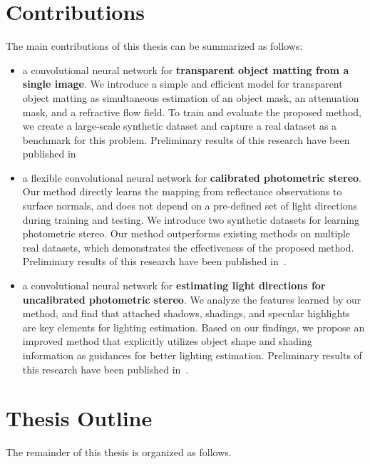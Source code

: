 \section{Contributions}

The main contributions of this thesis can be summarized as follows:

\begin{itemize}
    \item a convolutional neural network for \textbf{transparent object matting from a single image}. We introduce a simple and efficient model for transparent object matting as simultaneous estimation of an object mask, an attenuation mask, and a refractive flow field. To train and evaluate the proposed method, we create a large-scale synthetic dataset and capture a real dataset as a benchmark for this problem. Preliminary results of this research have been published in~\cite{chen2018tomnet,chen2019learning}

    \item a flexible convolutional neural network for \textbf{calibrated photometric stereo}. Our method directly learns the mapping from reflectance observations to surface normals, and does not depend on a pre-defined set of light directions during training and testing. We introduce two synthetic datasets for learning photometric stereo. Our method outperforms existing methods on multiple real datasets, which demonstrates the effectiveness of the proposed method. Preliminary results of this research have been published in~\cite{chen2018ps,chen2020deepps}.
    \item a convolutional neural network for \textbf{estimating light directions for uncalibrated photometric stereo}. We analyze the features learned by our method, and find that attached shadows, shadings, and specular highlights are key elements for lighting estimation. Based on our findings, we propose an improved method that explicitly utilizes object shape and shading information as guidances for better lighting estimation. Preliminary results of this research have been published in~\cite{chen2019self,chen2020chen_gcnet}.
\end{itemize}

\section{Thesis Outline}
The remainder of this thesis is organized as follows.

